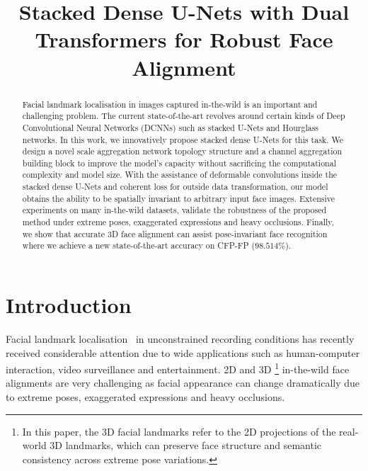 \documentclass{bmvc2k}
\title{Stacked Dense U-Nets with Dual Transformers for Robust Face Alignment}
\begin{document}
\maketitle

\begin{abstract} 
Facial landmark localisation in images captured in-the-wild is an important and challenging problem. The current state-of-the-art revolves around certain kinds of Deep Convolutional Neural Networks (DCNNs) such as stacked U-Nets and Hourglass networks. In this work, we innovatively propose stacked dense U-Nets for this task. We design a novel scale aggregation network topology structure and a channel aggregation building block to improve the model's capacity without sacrificing the computational complexity and model size. With the assistance of deformable convolutions inside the stacked dense U-Nets and coherent loss for outside data transformation, our model obtains the ability to be spatially invariant to arbitrary input face images. Extensive experiments on many in-the-wild datasets, validate the robustness of the proposed method under extreme poses, exaggerated expressions and heavy occlusions. Finally, we show that accurate 3D face alignment can assist pose-invariant face recognition where we achieve a new state-of-the-art accuracy on CFP-FP ($98.514\%$).
\end{abstract}

\section{Introduction}

Facial landmark localisation~\cite{sagonas2016300,stefanos2017menpo,stefanos20173Dmenpo,deng2016m,yang2015facial,yang2017stacked,liu2017adaptive,liu2016dual,deng2017joint} in unconstrained recording conditions has recently received considerable attention due to wide applications such as human-computer interaction, video surveillance and entertainment. 2D and 3D \footnote{In this paper, the 3D facial landmarks refer to the 2D projections of the real-world 3D landmarks, which can preserve face structure and semantic consistency across extreme pose variations.} in-the-wild face alignments are very challenging as facial appearance can change dramatically due to extreme poses, exaggerated expressions and heavy occlusions.
\end{document}
